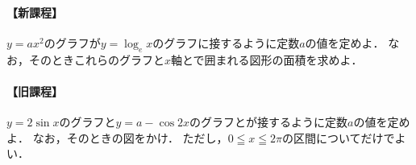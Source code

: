 \documentclass[../../main.tex]{subfiles}
\begin{document}
\paragraph{【新課程】}
$y=ax^2$のグラフが$y=\log_e x$のグラフに接するように定数$a$の値を定めよ．
なお，そのときこれらのグラフと$x$軸とで囲まれる図形の面積を求めよ．

\paragraph{【旧課程】}
$y=2\sin x$のグラフと$y=a-\cos 2x$のグラフとが接するように定数$a$の値を定めよ．
なお，そのときの図をかけ．
ただし，$0 \leqq x \leqq 2\pi$の区間についてだけでよい．
\end{document}
